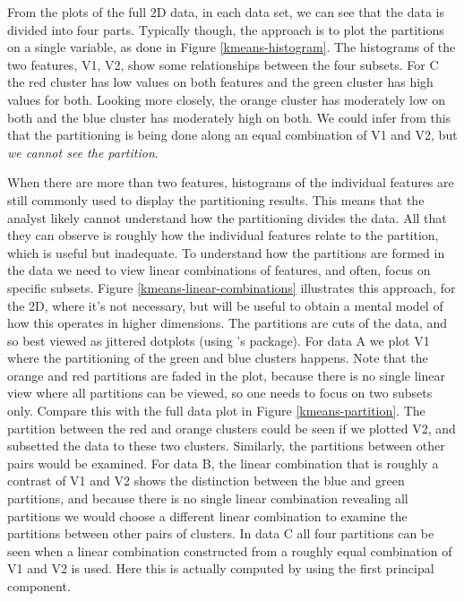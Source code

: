 \documentclass[article]{ajs}
\begin{document}
From the plots of the full 2D data, in each data set, we can see that the data is divided into four parts. Typically though, the approach is to plot the partitions on a single variable, as done in Figure \ref{kmeans-histogram}. The histograms of the two features, V1, V2, show some relationships between the four subsets. For C the red cluster has low values on both features and the green cluster has high values for both. Looking more closely, the orange cluster has moderately low on both and the blue cluster has moderately high on both. We could infer from this that the partitioning is being done along an equal combination of V1 and V2, but {\em we cannot see the partition}. %

When there are more than two features, histograms of the individual features are still commonly used to display the partitioning results. This means that the analyst likely cannot understand how the partitioning divides the data. All that they can observe is roughly how the individual features relate to the partition, which is useful but inadequate. To understand how the partitions are formed in the data we need to view linear combinations of features, and often, focus on specific subsets. Figure \ref{kmeans-linear-combinations} illustrates this approach, for the 2D, where it's not necessary, but will be useful to obtain a mental model of how this operates in higher dimensions. The partitions are cuts of the data, and so best viewed as jittered dotplots (using \citet{ggbeeswarm}'s  package). For data A we plot V1 where the partitioning of the green and blue clusters happens. Note that the orange and red partitions are faded in the plot, because there is no single linear view where all partitions can be viewed, so one needs to focus on two subsets only. Compare this with the full data plot in Figure \ref{kmeans-partition}. The partition between the red and orange clusters could be seen if we plotted V2, and subsetted the data to these two clusters. Similarly, the partitions between other pairs would be examined. For data B, the linear combination that is roughly a contrast of V1 and V2 shows the distinction between the blue and green partitions, and because there is no single linear combination revealing all partitions we would choose a different linear combination to examine the partitions between other pairs of clusters. In data C all four partitions can be seen when a linear combination constructed from a roughly equal combination of V1 and V2 is used. Here this is actually computed by using the first principal component. 
\end{document}
